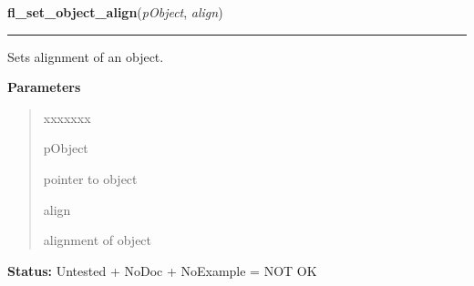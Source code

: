 \hspace{.8\funcindent}\begin{boxedminipage}{\funcwidth}

    \raggedright \textbf{fl\_set\_object\_align}(\textit{pObject}, \textit{align})

    \vspace{-1.5ex}

    \rule{\textwidth}{0.5\fboxrule}
\setlength{\parskip}{2ex}
    Sets alignment of an object.

\setlength{\parskip}{1ex}
      \textbf{Parameters}
      \vspace{-1ex}

      \begin{quote}
        \begin{Ventry}{xxxxxxx}

          \item[pObject]

          pointer to object

          \item[align]

          alignment of object

        \end{Ventry}

      \end{quote}

\textbf{Status:} Untested + NoDoc + NoExample = NOT OK



    \end{boxedminipage}

    \label{xformslib:library:fl_set_object_callback}

    \vspace{0.5ex}


